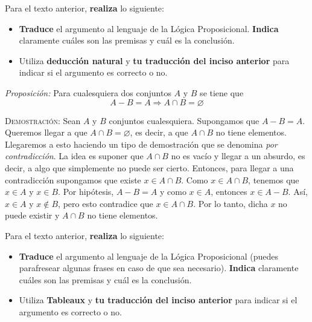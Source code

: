 \documentclass[oneside]{style}
\begin{document}
\begin{questions}[label=\protect\circled{\bfseries\arabic*}]
{        Para el texto anterior, \textbf{realiza} lo siguiente:
        \begin{itemize}
            \item \textbf{Traduce} el argumento al lenguaje de la Lógica 
            Proposicional. \textbf{Indica} claramente cuáles son las premisas 
            y cuál es la conclusión. 
            
            \item Utiliza \textbf{deducción natural} y \textbf{tu 
            traducción del inciso anterior} para indicar si el argumento es 
            correcto o no. 
        \end{itemize}
    }   

    \question
    {
        \textit{Proposición:} Para cualesquiera dos conjuntos $A$ y $B$ se tiene 
        que 
        \begin{equation*}
            A - B = A \Rightarrow A \cap B = \varnothing
        \end{equation*}

        \textsc{Demostración}: Sean $A$ y $B$ conjuntos cualesquiera. Supongamos 
        que $A-B = A$. Queremos llegar a que $A \cap B = \varnothing$, es decir, 
        a que $A \cap B$ no tiene elementos. Llegaremos a esto haciendo un tipo 
        de demostración que se denomina \textit{por contradicción}. La idea es 
        suponer que $A \cap B$ no es vacío y llegar a un absurdo, es decir, a algo que simplemente no puede ser cierto. 
        Entonces, para llegar a una contradicción supongamos que existe 
        $x \in A \cap B$. Como $x \in A \cap B$, tenemos que $x \in A$ y 
        $x \in B$. Por hipótesis, $A - B = A$ y como $x \in A$, entonces 
        $x \in A - B$. Así, $x \in A$ y $x \notin B$, pero esto contradice que 
        $x \in A \cap B$. Por lo tanto, dicha $x$ no puede existir y $A \cap B$
        no tiene elementos. 

        Para el texto anterior, \textbf{realiza} lo siguiente:
        \begin{itemize}
            \item \textbf{Traduce} el argumento al lenguaje de la Lógica 
            Proposicional (puedes parafresear algunas frases en caso de que sea 
            necesario). \textbf{Indica} claramente cuáles son las premisas y
            cuál es la conclusión.
            
            \item Utiliza \textbf{Tableaux} y \textbf{tu traducción del inciso 
            anterior} para indicar si el argumento es correcto o no. 
        \end{itemize}
    
    }
\end{questions}
\end{document}
